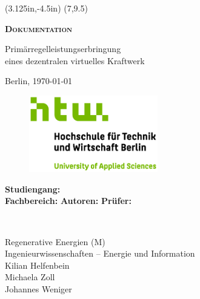 \begin{titlepage}
	\begin{center}
	
		\thisfancyput(3.125in,-4.5in){%
			\setlength{\unitlength}{2.5cm}\fancyoval(7,9.5)}
		
		\vspace*{1cm}
		
		\textbf{\textsc{{\huge Dokumentation}}}
 
		\vspace{0.5cm}

		{\Large Primärregelleistungserbringung\\\medskip\noindent eines dezentralen virtuelles Kraftwerk}
 
		\vspace{0.5cm}

		Berlin, \today
       
		\vspace*{1cm}
       
		\begin{figure}[H]
			\includegraphics[width=0.5\textwidth, center]{Bilder/HTWLogo.jpg}
		\end{figure}
 
		\vfill
 
		\vspace{0.8cm}
 
		\begin{minipage}{0.4\textwidth}
			\begin{flushleft}
				\textbf{Studiengang:}\\
				\textbf{Fachbereich:}\newline\newline
				\textbf{Autoren:}\newline\newline
				\textbf{Prüfer:}\\
			\end{flushleft}
		\end{minipage}~
		\begin{minipage}{0.4\textwidth}            
			\begin{flushright}
				Regenerative Energien (M)\\
				Ingenieurwissenschaften – Energie und Information\\
				Kilian Helfenbein\\
				Michaela Zoll\\
				Johannes Weniger\\
			\end{flushright}        
		\end{minipage}\\[2 cm]
		
	\end{center}
\end{titlepage}

\newpage